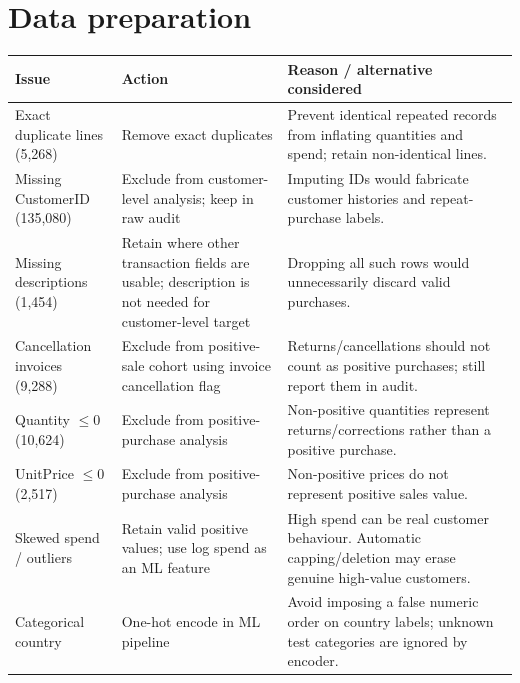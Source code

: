 \documentclass[10pt,a4paper,twocolumn]{article}
\begin{document}
\section{Data preparation}
{\footnotesize
\begin{tabularx}{\linewidth}{@{}L{2.1cm} L{2.8cm} Y@{}}
\toprule
\textbf{Issue} & \textbf{Action} & \textbf{Reason / alternative considered}\\
\midrule
Exact duplicate lines (5,268) & Remove exact duplicates & Prevent identical repeated records from inflating quantities and spend; retain non-identical lines.\\
Missing CustomerID (135,080) & Exclude from customer-level analysis; keep in raw audit & Imputing IDs would fabricate customer histories and repeat-purchase labels.\\
Missing descriptions (1,454) & Retain where other transaction fields are usable; description is not needed for customer-level target & Dropping all such rows would unnecessarily discard valid purchases.\\
Cancellation invoices (9,288) & Exclude from positive-sale cohort using invoice cancellation flag & Returns/cancellations should not count as positive purchases; still report them in audit.\\
Quantity $\leq0$ (10,624) & Exclude from positive-purchase analysis & Non-positive quantities represent returns/corrections rather than a positive purchase.\\
UnitPrice $\leq0$ (2,517) & Exclude from positive-purchase analysis & Non-positive prices do not represent positive sales value.\\
Skewed spend / outliers & Retain valid positive values; use log spend as an ML feature & High spend can be real customer behaviour. Automatic capping/deletion may erase genuine high-value customers.\\
Categorical country & One-hot encode in ML pipeline & Avoid imposing a false numeric order on country labels; unknown test categories are ignored by encoder.\\
\bottomrule
\end{tabularx}}
\end{document}

